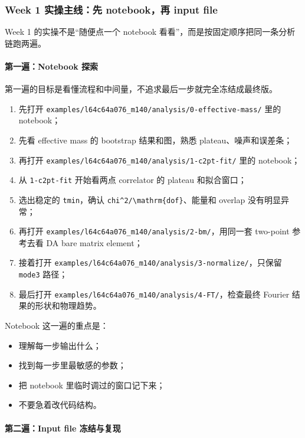 \documentclass[11pt,a4paper,fontset=fandol]{ctexart}
\begin{document}
\subsubsection{Week 1 实操主线：先 notebook，再 input file}

Week 1 的实操不是“随便点一个 notebook 看看”，而是按固定顺序把同一条分析链跑两遍。

\paragraph{第一遍：Notebook 探索}

第一遍的目标是看懂流程和中间量，不追求最后一步就完全冻结成最终版。

\begin{enumerate}[leftmargin=2em]
  \item 先打开 \lstinline|examples/l64c64a076_m140/analysis/0-effective-mass/| 里的 notebook；
  \item 先看 effective mass 的 bootstrap 结果和图，熟悉 plateau、噪声和误差条；
  \item 再打开 \lstinline|examples/l64c64a076_m140/analysis/1-c2pt-fit/| 里的 notebook；
  \item 从 \lstinline|1-c2pt-fit| 开始看两点 correlator 的 plateau 和拟合窗口；
  \item 选出稳定的 \lstinline|tmin|，确认 \lstinline|chi^2/\mathrm{dof}|、能量和 overlap 没有明显异常；
  \item 再打开 \lstinline|examples/l64c64a076_m140/analysis/2-bm/|，用同一套 two-point 参考去看 DA bare matrix element；
  \item 接着打开 \lstinline|examples/l64c64a076_m140/analysis/3-normalize/|，只保留 \lstinline|mode3| 路径；
  \item 最后打开 \lstinline|examples/l64c64a076_m140/analysis/4-FT/|，检查最终 Fourier 结果的形状和物理趋势。
\end{enumerate}

Notebook 这一遍的重点是：

\begin{itemize}[leftmargin=2em]
  \item 理解每一步输出什么；
  \item 找到每一步里最敏感的参数；
  \item 把 notebook 里临时调过的窗口记下来；
  \item 不要急着改代码结构。
\end{itemize}

\paragraph{第二遍：Input file 冻结与复现}
\end{document}
